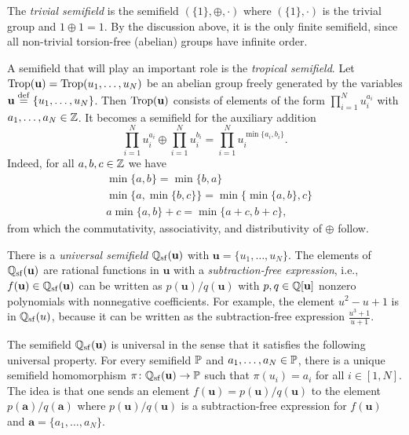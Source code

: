 \renewcommand{\bmu}{\mathbf{u}}
\renewcommand{\bma}{\mathbf{a}}

\begin{example}

	The \emph{trivial semifield} is the semifield $(\{1\}, \oplus,
		\cdot)$ where $(\{1\}, \cdot)$ is the trivial group and $1 \oplus 1 = 1$. By the
	discussion above, it is the only finite semifield, since all non-trivial torsion-free
	(abelian) groups have infinite order.
\end{example}
\begin{example}

	A semifield that will play an important role is the \emph{tropical
		semifield}. Let $\Trop(\bmu) = \Trop(u_1, \dots, u_N)$ be an
	abelian group freely generated by the variables $\bmu \defeq \{u_1, \dots, u_N\}$. Then
	$\Trop(\bmu)$ consists of elements of the form $\prod_{i=1}^N u_i^{a_i}$ with $a_1,
		\dots, a_N \in \mathbb{Z}$. It becomes a semifield for the auxiliary addition
	\begin{equation*}
		\prod_{i=1}^N u_i^{a_i}  \oplus \prod_{i=1}^N u_i^{b_i} =  \prod_{i=1}^N u_i^{\min\{a_i, b_i\}}.
	\end{equation*}
	Indeed, for all $a,b,c \in \mathbb{Z}$ we have
	\begin{align*}
		 & \min \{a,b \} = \min \{b, a\}                    \\
		 & \min \{a, \min\{b,c\}\} = \min\{\min\{a,b\}, c\} \\
		 & a \min \{a, b\} + c = \min\{a + c, b + c\},
	\end{align*}
	from which the commutativity, associativity, and distributivity of $\oplus$ follow.

\end{example}

\begin{example}

	There is a \emph{universal semifield} $\bbQ_{{\tsf}}(\bmu)$
	with $\bmu = \{u_1, \dots, u_N\}$. The elements of $\bbQ_{\tsf}(\bmu)$ are rational
	functions in $\bmu$ with a \emph{subtraction-free expression},
	i.e., $f(\bmu) \in \bbQ_{\tsf}(\bmu)$ can be written as $p(\bmu) / q (\bmu)$ with $p, q
		\in \bbQ[\bmu]$ nonzero polynomials with nonnegative coefficients. For example, the
	element $u^2 - u + 1$ is in $\mathbb{Q}_{\operatorname{sf}}(u)$, because it can be written as the
	subtraction-free expression $\frac{u^3 + 1}{u + 1}$.

	The semifield $\bbQ_{{\tsf}}(\bmu)$ is universal in the sense that it satisfies the
	following universal property. For every semifield $\mathbb{P}$ and $a_1, \dots, a_N \in
		\mathbb{P}$, there is a unique semifield homomorphism $\pi \colon \bbQ_{\tsf}(\bmu) \to \bbP$
	such that $\pi(u_i) = a_i$ for all $i \in [1, N]$. The idea is that one sends an
	element $f(\bmu) = p(\bmu) / q(\bmu)$ to the element $p(\bma) / q(\bma)$ where $p(\bmu)
		/ q(\bmu)$ is a subtraction-free expression for $f(\bmu)$ and $\bma = \{a_1, \dots,
		a_N\}$.
\end{example}

